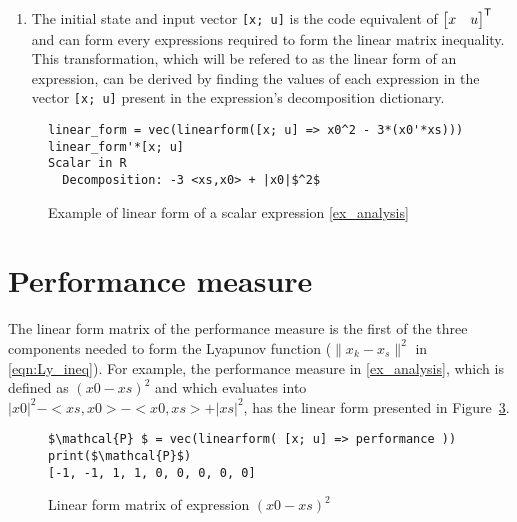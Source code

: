 \begin{enumerate}
\begin{figure}[h!]
\begin{lstlisting}[mathescape]
u  = collect(setdiff(variables(x$^+$), variables(x)))
5-element Vector{Expression}:
    <xs,$\nabla $f(x0)>
    <x0,$\nabla $f(x0)>
    <$\nabla $f(x0),xs>
    <$\nabla $f(x0),x0>
    |$\nabla $f(x0)|$^2$
        \end{lstlisting}    
    \caption{Updated state and input real scalar expressions from example \ref{ex_analysis}}
    \label{ex_updatedstate_input}
    \end{figure}
    \item The initial state and input vector \texttt{[x; u]} is the code equivalent of $\begin{bmatrix}x & u\end{bmatrix}^{\mathsf{T}}$ and can form every expressions required to form the linear matrix inequality. This transformation, which will be refered to as the linear form of an expression, can be derived by finding the values of each expression in the vector \texttt{[x; u]} present in the expression's decomposition dictionary.
\end{enumerate}

\begin{figure}[h!]
    \begin{lstlisting}[mathescape] 
linear_form = vec(linearform([x; u] => x0^2 - 3*(x0'*xs)))
linear_form'*[x; u]
Scalar in R
  Decomposition: -3 <xs,x0> + |x0|$^2$
\end{lstlisting}    
\caption{Example of linear form of a scalar expression \ref{ex_analysis}}
\label{ex_linearform}
\end{figure}

\section{Performance measure}
The linear form matrix of the performance measure is the first of the three components needed to form the Lyapunov function ($\|x_k - x_s\|^2$ in \eqref{eqn:Ly_ineq}). For example, the performance measure in \ref{ex_analysis}, which is defined as $(x0-xs)^2$ and which evaluates into $|x0|^2 - <xs, x0> - <x0, xs> + |xs|^2$, has the linear form presented in Figure~\ref{ex_linearform2}.
\begin{figure}[h!]
\begin{lstlisting}[mathescape]
$\mathcal{P} $ = vec(linearform( [x; u] => performance ))
print($\mathcal{P}$)
[-1, -1, 1, 1, 0, 0, 0, 0, 0]
\end{lstlisting}
\caption{Linear form matrix of expression $(x0-xs)^2$}
\label{ex_linearform2}
\end{figure}

